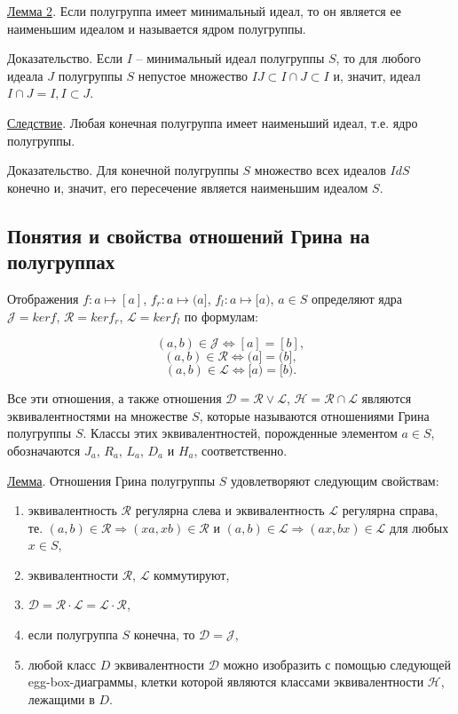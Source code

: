 \documentclass[bachelor, och, labwork]{shiza}
\newcommand{\La}{\mathcal{L}}
\newcommand{\Ra}{\mathcal{R}}
\newcommand{\Da}{\mathcal{D}}
\newcommand{\Ha}{\mathcal{H}}
\newcommand{\Ja}{\mathcal{J}}
\begin{document}
	\underline{Лемма 2}. Если полугруппа имеет минимальный идеал, то он является ее наименьшим идеалом и называется ядром полугруппы.
	
	Доказательство. Если $I$ – минимальный идеал полугруппы $S$, то для любого идеала $J$ полугруппы $S$ непустое множество $IJ \subset I \cap J \subset I$ и, значит, идеал $I \cap J = I,I \subset J$.
	
	\underline{Следствие}. Любая конечная полугруппа имеет наименьший идеал, т.е. ядро полугруппы.
	
	Доказательство. Для конечной полугруппы $S$ множество всех идеалов $Id S$ конечно и, значит, его пересечение является наименьшим идеалом $S$.

	    \subsection{Понятия и свойства отношений Грина на полугруппах}	
	
	Отображения $f: a \mapsto [a]$, $f_r:  a \mapsto (a]$, $f_l: a \mapsto [a)$, $a \in S$ определяют ядра $\Ja = ker f$, $\Ra = ker f_r$, $\La = ker f_l$ по формулам:
	
	$$(a,b) \in \Ja \iff [a] = [b],$$
	$$(a,b) \in \Ra \iff (a] = (b],$$
	$$(a,b) \in \La \iff [a) = [b).$$
	
	Все эти отношения, а также отношения $\Da = \Ra \vee \La$, $\Ha = \Ra \cap \La$ являются эквивалентностями на множестве $S$, которые называются отношениями Грина полугруппы $S$. Классы этих эквивалентностей, порожденные элементом $a \in S$, обозначаются $J_a$, $R_a$, $L_a$, $D_a$ и $H_a$, соответственно.
	
	\underline{Лемма}. Отношения Грина полугруппы $S$ удовлетворяют следующим свойствам:
	
	\begin{enumerate} 
		\item эквивалентность $\Ra$ регулярна слева и эквивалентность $\La$ регулярна справа, те. $(a,b)  \in \Ra \Rightarrow (xa,xb) \in \Ra$ и $(a,b) \in \La \Rightarrow (ax,bx) \in \La$ для любых $x \in S$,
		
		\item эквивалентности $\Ra$, $\La$ коммутируют,
		
		\item $\Da = \Ra \cdot \La = \La \cdot \Ra$,
		
		\item если полугруппа $S$ конечна, то $\Da = \Ja$,
		
		\item любой класс $D$ эквивалентности $\Da$ можно изобразить с помощью следующей egg-box-диаграммы, клетки которой являются классами эквивалентности $\Ha$, лежащими в $D$.
	\end{enumerate} 
\end{document}
